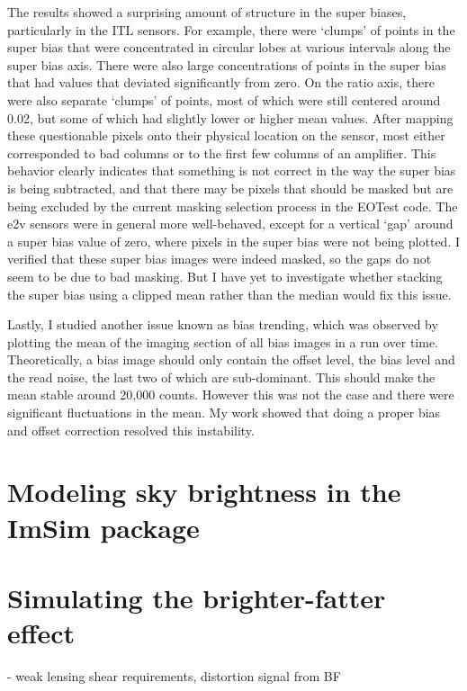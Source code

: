 The results showed a surprising amount of structure in the super biases, particularly in the ITL sensors. For example, there were ‘clumps’ of points in the super bias that were concentrated in circular lobes at various intervals along the super bias axis. There were also large concentrations of points in the super bias that had values that deviated significantly from zero. On the ratio axis, there were also separate ‘clumps’ of points, most of which were still centered around 0.02, but some of which had slightly lower or higher mean values. After mapping these questionable pixels onto their physical location on the sensor, most either corresponded to bad columns or to the first few columns of an amplifier. This behavior clearly indicates that something is not correct in the way the super bias is being subtracted, and that there may be pixels that should be masked but are being excluded by the current masking selection process in the EOTest code. The e2v sensors were in general more well-behaved, except for a vertical ‘gap’ around a super bias value of zero, where pixels in the super bias were not being plotted. I verified that these super bias images were indeed masked, so the gaps do not seem to be due to bad masking. But I have yet to investigate whether stacking the super bias using a clipped mean rather than the median would fix this issue. 

Lastly, I studied another issue known as bias trending, which was observed by plotting the mean of the imaging section of all bias images in a run over time. Theoretically, a bias image should only contain the offset level, the bias level and the read noise, the last two of which are sub-dominant. This should make the mean stable around 20,000 counts. However this was not the case and there were significant fluctuations in the mean. My work showed that doing a proper bias and offset correction resolved this instability.

\section{Modeling sky brightness in the ImSim package}
\section{Simulating the brighter-fatter effect}

- weak lensing shear requirements, distortion signal from BF

